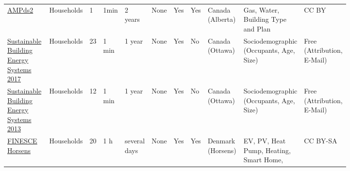 \begin{sidewaystable*}
{\begin{tabular}{p{0.16\linewidth}p{0.05\linewidth}p{0.04\linewidth}p{0.05\linewidth}p{0.04\linewidth}p{0.04\linewidth}p{0.02\linewidth}p{0.02\linewidth}p{0.12\linewidth}p{0.14\linewidth}p{0.14\linewidth}}
			\href{https://dataverse.harvard.edu/dataset.xhtml?persistentId=doi\%3A10.7910/DVN/FIE0S4\%20}{AMPds2} \cite{Makonin2016ata, Makonin2016ewa}  & Households & 1     & 1min  & 2 years & None  & Yes   & Yes   & Canada (Alberta) & Gas, Water, Building Type and Plan & CC BY \\
			\href{https://carleton.ca/sbes/publications/electric-demand-profiles-downloadable/}{Sustainable Building Energy Systems 2017} \cite{Johnson2017edf} & Households & 23    & 1 min & 1 year & None  & Yes   & No    & Canada (Ottawa) & Sociodemographic (Occupants, Age, Size) & Free (Attribution, E-Mail) \\
			\href{https://carleton.ca/sbes/publications/electric-demand-profiles-downloadable/}{Sustainable Building Energy Systems 2013} \cite{Saldanha2012mee} & Households & 12    & 1 min & 1 year & None  & Yes   & No    & Canada (Ottawa) & Sociodemographic (Occupants, Age, Size) & Free (Attribution, E-Mail) \\
			\href{https://data.lab.fiware.org/organization/9569f9bd-42bd-414f-b8d9-112553ea9dfb?tags=FINESCE}{FINESCE Horsens}
			& Households & 20    & 1 h   & several days & None  & Yes   & Yes   & Denmark (Horsens) & EV, PV, Heat Pump, Heating, Smart Home,  & CC BY-SA \\
			

\end{tabular}}
\end{sidewaystable*}
